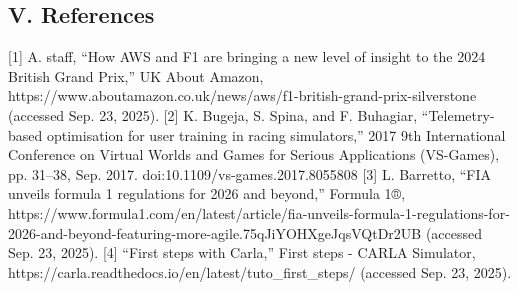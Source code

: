 \documentclass[11pt]{article} %
\begin{document}
\subsection {V. References}


[1] A. staff, “How AWS and F1 are bringing a new level of insight to the 2024 British Grand Prix,” UK About Amazon, https://www.aboutamazon.co.uk/news/aws/f1-british-grand-prix-silverstone (accessed Sep. 23, 2025). 
[2] K. Bugeja, S. Spina, and F. Buhagiar, “Telemetry-based optimisation for user training in racing simulators,” 2017 9th International Conference on Virtual Worlds and Games for Serious Applications (VS-Games), pp. 31–38, Sep. 2017. doi:10.1109/vs-games.2017.8055808 
[3] L. Barretto, “FIA unveils formula 1 regulations for 2026 and beyond,” Formula 1®, https://www.formula1.com/en/latest/article/fia-unveils-formula-1-regulations-for-2026-and-beyond-featuring-more-agile.75qJiYOHXgeJqsVQtDr2UB (accessed Sep. 23, 2025). 
[4] “First steps with Carla,” First steps - CARLA Simulator, https://carla.readthedocs.io/en/latest/tuto_first_steps/ (accessed Sep. 23, 2025). 
\end{document}
